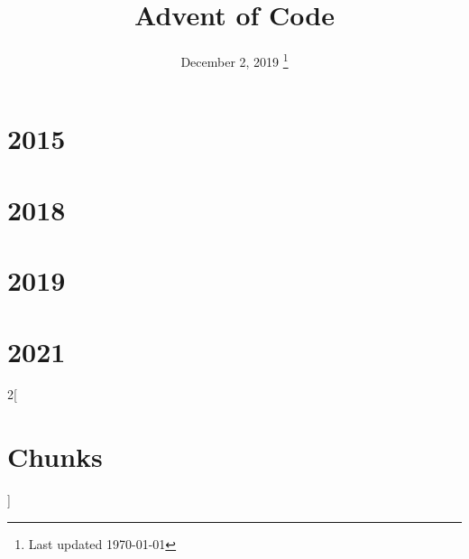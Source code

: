 \documentclass[a4paper,nobib,titlepage,xelatex]{tufte-book}
\title{Advent of Code}
\date{%
  December 2, 2019
  \thanks{Last updated \today}
}
\begin{document}
\frontmatter
\maketitle
\tableofcontents
\mainmatter
\newpage

\chapter{2015}


\chapter{2018}


\chapter{2019}


\chapter{2021}


\backmatter
\newpage
\begin{multicols}{2}[\chapter*{Chunks}]
  \nowebchunks
\end{multicols}




\newpage
\listoftodos[To-Do]
\end{document}
